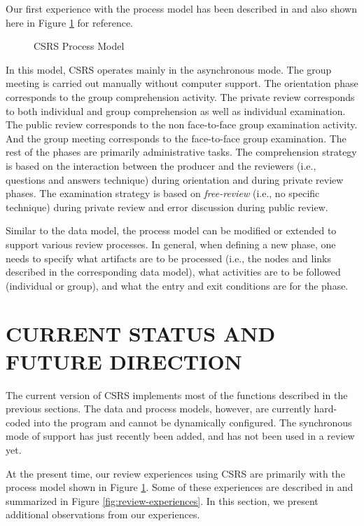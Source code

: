 Our first experience with the process model has been described in
\cite{Johnson93,Johnson93b} and also shown here in Figure
\ref{fig:process-model} for reference.

\begin{figure}[tb]
  {\centerline{}}
  \caption{CSRS Process Model}
  \label{fig:process-model}
\end{figure}

In this model, CSRS operates mainly in the asynchronous mode.  The
group meeting is carried out manually without computer support.  The
orientation phase corresponds to the group comprehension activity. The
private review corresponds to both individual and group comprehension
as well as individual examination. The public review corresponds to
the non face-to-face group examination activity.  And the group
meeting corresponds to the face-to-face group examination. The rest of
the phases are primarily administrative tasks.  The comprehension
strategy is based on the interaction between the producer and the
reviewers (i.e., questions and answers technique) during orientation
and during private review phases. The examination strategy is based on
{\it free-review} (i.e., no specific technique) during private review
and error discussion during public review.

Similar to the data model, the process model can be modified or
extended to support various review processes. In general, when
defining a new phase, one needs to specify what artifacts are to be
processed (i.e., the nodes and links described in the corresponding
data model), what activities are to be followed (individual or group),
and what the entry and exit conditions are for the phase.


\section {CURRENT STATUS AND FUTURE DIRECTION}

The current version of CSRS implements most of the functions described
in the previous sections. The data and process models, however, are
currently hard-coded into the program and cannot be dynamically
configured. The synchronous mode of support has just recently been
added, and has not been used in a review yet.

At the present time, our review experiences using CSRS are primarily
with the process model shown in Figure \ref{fig:process-model}. Some
of these experiences are described in \cite{Johnson93b} and summarized
in Figure \ref{fig:review-experiences}.  In this section, we present
additional observations from our experiences.


